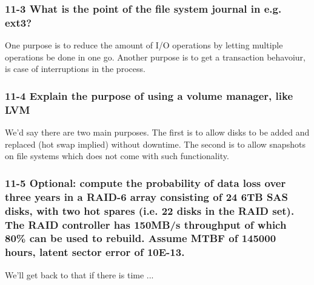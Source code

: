 \subsubsection{11-3 What is the point of the file system journal in e.g. ext3?}
One purpose is to reduce the amount of I/O operations by letting multiple operations be done in one go. Another purpose is to get a transaction behavoiur, is case of interruptions in the process.

\subsubsection{11-4 Explain the purpose of using a volume manager, like LVM}
We'd say there are two main purposes. The first is to allow disks to be added and replaced (hot swap implied) without downtime. The second is to allow snapshots on file systems which does not come with such functionality.

\subsubsection{11-5 Optional: compute the probability of data loss over three years in a RAID-6 array consisting of 24 6TB SAS disks, with two hot spares (i.e. 22 disks in the RAID set). The RAID controller has 150MB/s throughput of which 80\% can be used to rebuild. Assume MTBF of 145000 hours, latent sector error of 10E-13.}
We'll get back to that if there is time ...


